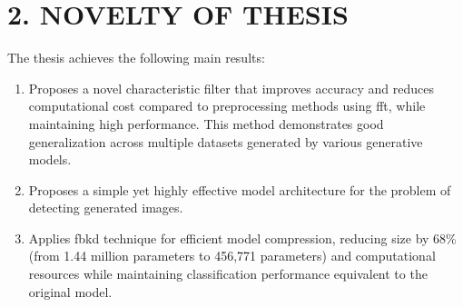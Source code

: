 \section*{2. NOVELTY OF THESIS}
The thesis achieves the following main results:

\begin{enumerate}
	\item Proposes a novel characteristic filter that improves accuracy and reduces computational cost compared to preprocessing methods using \gls{fft}, while maintaining high performance. This method demonstrates good generalization across multiple datasets generated by various generative models.
	
	\item Proposes a simple yet highly effective model architecture for the problem of detecting generated images.
	
	\item Applies \gls{fbkd} technique for efficient model compression, reducing size by 68\% (from 1.44 million parameters to 456,771 parameters) and computational resources while maintaining classification performance equivalent to the original model.
	
\end{enumerate}
%









